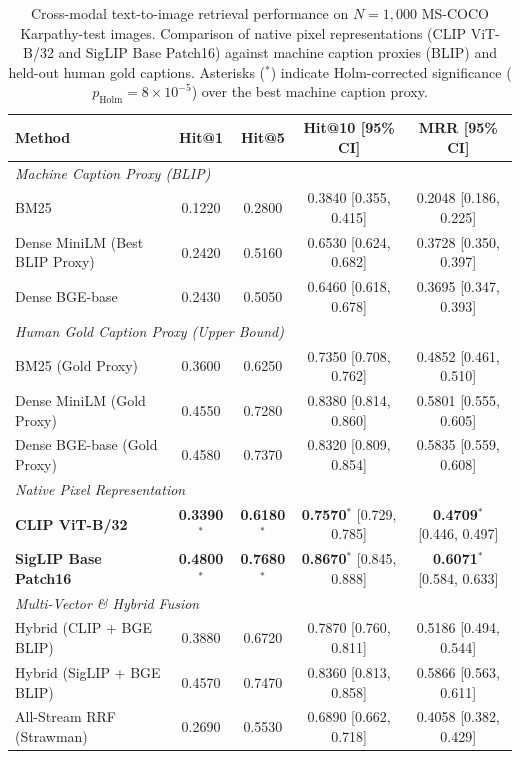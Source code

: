 \begin{table}[htbp]
\centering
\small
\caption{Cross-modal text-to-image retrieval performance on $N=1{,}000$ MS-COCO Karpathy-test images. Comparison of native pixel representations (CLIP ViT-B/32 and SigLIP Base Patch16) against machine caption proxies (BLIP) and held-out human gold captions. Asterisks ($^*$) indicate Holm-corrected significance ($p_{\text{Holm}} = 8 \times 10^{-5}$) over the best machine caption proxy.}
\label{tab:coco_benchmarks_v3}
\begin{tabular}{lcccc}
\toprule
Method & Hit@1 & Hit@5 & Hit@10 [95\% CI] & MRR [95\% CI] \\
\midrule
\multicolumn{5}{l}{\textit{Machine Caption Proxy (BLIP)}} \\
BM25                          & 0.1220 & 0.2800 & 0.3840 [0.355, 0.415] & 0.2048 [0.186, 0.225] \\
Dense MiniLM (Best BLIP Proxy)& 0.2420 & 0.5160 & 0.6530 [0.624, 0.682] & 0.3728 [0.350, 0.397] \\
Dense BGE-base                & 0.2430 & 0.5050 & 0.6460 [0.618, 0.678] & 0.3695 [0.347, 0.393] \\
\midrule
\multicolumn{5}{l}{\textit{Human Gold Caption Proxy (Upper Bound)}} \\
BM25 (Gold Proxy)             & 0.3600 & 0.6250 & 0.7350 [0.708, 0.762] & 0.4852 [0.461, 0.510] \\
Dense MiniLM (Gold Proxy)     & 0.4550 & 0.7280 & 0.8380 [0.814, 0.860] & 0.5801 [0.555, 0.605] \\
Dense BGE-base (Gold Proxy)   & 0.4580 & 0.7370 & 0.8320 [0.809, 0.854] & 0.5835 [0.559, 0.608] \\
\midrule
\multicolumn{5}{l}{\textit{Native Pixel Representation}} \\
\textbf{CLIP ViT-B/32}        & \textbf{0.3390}$^*$ & \textbf{0.6180}$^*$ & \textbf{0.7570}$^*$ [0.729, 0.785] & \textbf{0.4709}$^*$ [0.446, 0.497] \\
\textbf{SigLIP Base Patch16}  & \textbf{0.4800}$^*$ & \textbf{0.7680}$^*$ & \textbf{0.8670}$^*$ [0.845, 0.888] & \textbf{0.6071}$^*$ [0.584, 0.633] \\
\midrule
\multicolumn{5}{l}{\textit{Multi-Vector \& Hybrid Fusion}} \\
Hybrid (CLIP + BGE BLIP)      & 0.3880 & 0.6720 & 0.7870 [0.760, 0.811] & 0.5186 [0.494, 0.544] \\
Hybrid (SigLIP + BGE BLIP)    & 0.4570 & 0.7470 & 0.8360 [0.813, 0.858] & 0.5866 [0.563, 0.611] \\
All-Stream RRF (Strawman)     & 0.2690 & 0.5530 & 0.6890 [0.662, 0.718] & 0.4058 [0.382, 0.429] \\
\bottomrule
\end{tabular}
\end{table}
